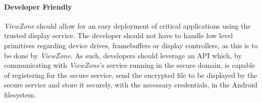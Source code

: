
\paragraph{\textbf{Developer Friendly}}

\emph{ViewZone} should allow for an easy deployment of critical applications using the trusted display service. The developer should not have to handle low level primitives regarding device drives, framebuffers or display controllers, as this is to be done by \emph{ViewZone}. As such, developers should leverage an API which, by communicating with \emph{ViewZone}'s service running in the secure domain, is capable of registering for the secure service, send the encrypted file to be displayed by the secure service and store it securely, with the necessary credentials, in the Android filesystem.

